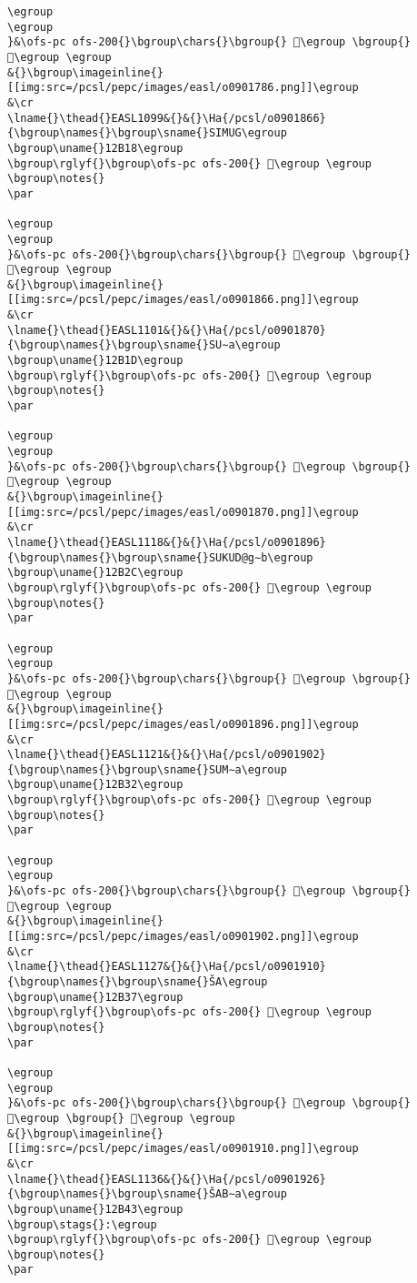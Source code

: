 \begin{verbatim}
\egroup
\egroup
}&\ofs-pc ofs-200{}\bgroup\chars{}\bgroup{} 𒬉\egroup \bgroup{} 𒫨\egroup \egroup
&{}\bgroup\imageinline{}[[img:src=/pcsl/pepc/images/easl/o0901786.png]]\egroup
&\cr
\lname{}\thead{}EASL1099&{}&{}\Ha{/pcsl/o0901866}{\bgroup\names{}\bgroup\sname{}SIMUG\egroup
\bgroup\uname{}12B18\egroup
\bgroup\rglyf{}\bgroup\ofs-pc ofs-200{} 𒬘\egroup \egroup
\bgroup\notes{}
\par 

\egroup
\egroup
}&\ofs-pc ofs-200{}\bgroup\chars{}\bgroup{} 𒬘\egroup \bgroup{} 𒬙\egroup \egroup
&{}\bgroup\imageinline{}[[img:src=/pcsl/pepc/images/easl/o0901866.png]]\egroup
&\cr
\lname{}\thead{}EASL1101&{}&{}\Ha{/pcsl/o0901870}{\bgroup\names{}\bgroup\sname{}SU∼a\egroup
\bgroup\uname{}12B1D\egroup
\bgroup\rglyf{}\bgroup\ofs-pc ofs-200{} 𒬝\egroup \egroup
\bgroup\notes{}
\par 

\egroup
\egroup
}&\ofs-pc ofs-200{}\bgroup\chars{}\bgroup{} 𒬛\egroup \bgroup{} 𒬝\egroup \egroup
&{}\bgroup\imageinline{}[[img:src=/pcsl/pepc/images/easl/o0901870.png]]\egroup
&\cr
\lname{}\thead{}EASL1118&{}&{}\Ha{/pcsl/o0901896}{\bgroup\names{}\bgroup\sname{}SUKUD@g∼b\egroup
\bgroup\uname{}12B2C\egroup
\bgroup\rglyf{}\bgroup\ofs-pc ofs-200{} 𒬬\egroup \egroup
\bgroup\notes{}
\par 

\egroup
\egroup
}&\ofs-pc ofs-200{}\bgroup\chars{}\bgroup{} 𒬬\egroup \bgroup{} 𒬭\egroup \egroup
&{}\bgroup\imageinline{}[[img:src=/pcsl/pepc/images/easl/o0901896.png]]\egroup
&\cr
\lname{}\thead{}EASL1121&{}&{}\Ha{/pcsl/o0901902}{\bgroup\names{}\bgroup\sname{}SUM∼a\egroup
\bgroup\uname{}12B32\egroup
\bgroup\rglyf{}\bgroup\ofs-pc ofs-200{} 𒬲\egroup \egroup
\bgroup\notes{}
\par 

\egroup
\egroup
}&\ofs-pc ofs-200{}\bgroup\chars{}\bgroup{} 𒬰\egroup \bgroup{} 𒬲\egroup \egroup
&{}\bgroup\imageinline{}[[img:src=/pcsl/pepc/images/easl/o0901902.png]]\egroup
&\cr
\lname{}\thead{}EASL1127&{}&{}\Ha{/pcsl/o0901910}{\bgroup\names{}\bgroup\sname{}ŠA\egroup
\bgroup\uname{}12B37\egroup
\bgroup\rglyf{}\bgroup\ofs-pc ofs-200{} 𒬷\egroup \egroup
\bgroup\notes{}
\par 

\egroup
\egroup
}&\ofs-pc ofs-200{}\bgroup\chars{}\bgroup{} 𒬻\egroup \bgroup{} 𒬼\egroup \bgroup{} 𒬷\egroup \egroup
&{}\bgroup\imageinline{}[[img:src=/pcsl/pepc/images/easl/o0901910.png]]\egroup
&\cr
\lname{}\thead{}EASL1136&{}&{}\Ha{/pcsl/o0901926}{\bgroup\names{}\bgroup\sname{}ŠAB∼a\egroup
\bgroup\uname{}12B43\egroup
\bgroup\stags{}:\egroup
\bgroup\rglyf{}\bgroup\ofs-pc ofs-200{} 𒭃\egroup \egroup
\bgroup\notes{}
\par 


\end{verbatim}
